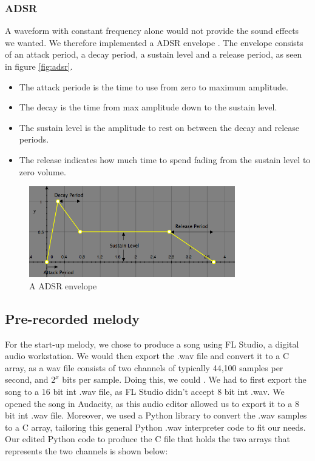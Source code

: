 \subsubsection{ADSR}

A waveform with constant frequency alone would not provide the sound effects we wanted. We therefore implemented a ADSR envelope \cite{adsr}.
The envelope consists of an attack period, a decay period, a sustain level and a release period, as seen in figure \ref{fig:adsr}.

\begin{itemize}
    \item The attack periode is the time to use from zero to maximum amplitude.
    \item The decay is the time from max amplitude down to the sustain level.
    \item The sustain level is the amplitude to rest on between the decay and release periods.
    \item The release indicates how much time to spend fading from the sustain level to zero volume.
\end{itemize}

\begin{figure}[ht!]
    \begin{center}
    \includegraphics[width=0.8\textwidth]{assets/img/adsr.png}
    \caption{A ADSR envelope}
    \label{fig:adsr_envelope}
    \end{center}
\end{figure}

\subsection{Pre-recorded melody}

For the start-up melody, we chose to produce a song using FL Studio, a digital audio workstation. We would then export the .wav file and convert it to a C array, as a wav file consists of two channels of typically 44,100 samples per second, and $2^x$ bits per sample. Doing this, we could . We had to first export the song to a 16 bit int .wav file, as FL Studio didn't accept 8 bit int .wav. We opened the song in Audacity, as this audio editor allowed us to export it to a 8 bit int .wav file. Moreover, we used a Python library to convert the .wav samples to a C array, tailoring this general Python .wav interpreter code \cite{wav} to fit our needs. Our edited Python code to produce the C file that holds the two arrays that represents the two channels is shown below:

